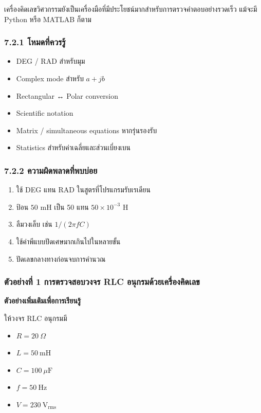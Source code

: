 เครื่องคิดเลขวิศวกรรมยังเป็นเครื่องมือที่มีประโยชน์มากสำหรับการตรวจคำตอบอย่างรวดเร็ว แม้จะมี Python หรือ MATLAB ก็ตาม

\subsubsection{7.2.1 โหมดที่ควรรู้}

\begin{itemize}
    \item DEG / RAD สำหรับมุม
    \item Complex mode สำหรับ $a+jb$
    \item Rectangular ↔ Polar conversion
    \item Scientific notation
    \item Matrix / simultaneous equations หากรุ่นรองรับ
    \item Statistics สำหรับค่าเฉลี่ยและส่วนเบี่ยงเบน
\end{itemize}

\subsubsection{7.2.2 ความผิดพลาดที่พบบ่อย}

\begin{enumerate}
    \item ใช้ DEG แทน RAD ในสูตรที่โปรแกรมรับเรเดียน
    \item ป้อน $50\text{ mH}$ เป็น 50 แทน $50\times10^{-3}$ H
    \item ลืมวงเล็บ เช่น $1/(2\pi fC)$
    \item ใช้ค่าพีแบบปัดเศษมากเกินไปในหลายขั้น
    \item ปัดเลขกลางทางก่อนจบการคำนวณ
\end{enumerate}

\subsubsection{ตัวอย่างที่ 1 การตรวจสอบวงจร RLC อนุกรมด้วยเครื่องคิดเลข}

\textbf{ตัวอย่างเพิ่มเติมเพื่อการเรียนรู้}

ให้วงจร RLC อนุกรมมี

\begin{itemize}
    \item $R=20\ \Omega$
    \item $L=50\ \text{mH}$
    \item $C=100\ \mu\text{F}$
    \item $f=50\ \text{Hz}$
    \item $V=230\ \text{V}_{\text{rms}}$
\end{itemize}

